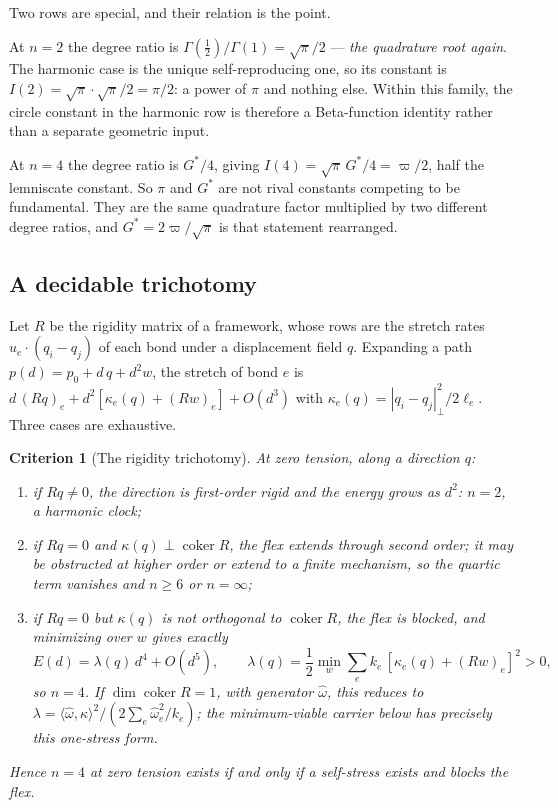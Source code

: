 \documentclass[11pt,a4paper]{article}
\newcommand{\Gstar}{{G^{*}}}
\theoremstyle{definition}
\theoremstyle{plain}
\newtheorem{criterion}{Criterion}
\theoremstyle{remark}
\begin{document}
Two rows are special, and their relation is the point.

At $n=2$ the degree ratio is $\Gamma(\tfrac12)/\Gamma(1) = \sqrt\pi/2$ ---
\emph{the quadrature root again}. The harmonic case is the unique
self-reproducing one, so its constant is $I(2) = \sqrt\pi\cdot\sqrt\pi/2 =
\pi/2$: a power of $\pi$ and nothing else. Within this family, the circle
constant in the harmonic row is therefore a Beta-function identity rather
than a separate geometric input.

At $n=4$ the degree ratio is $\Gstar/4$, giving $I(4) = \sqrt\pi\,\Gstar/4
= \varpi/2$, half the lemniscate constant. So $\pi$ and $\Gstar$ are not
rival constants competing to be fundamental. They are the same
quadrature factor multiplied by two different degree ratios, and
$\Gstar = 2\varpi/\sqrt\pi$ is that statement rearranged.

\subsection{A decidable trichotomy}

Let $R$ be the rigidity matrix of a framework, whose rows are the stretch
rates $\hat{u}_e\cdot(q_i-q_j)$ of each bond under a displacement field
$q$. Expanding a path $p(d) = p_0 + d\,q + d^2 w$, the stretch of bond $e$
is $d\,(Rq)_e + d^2[\kappa_e(q) + (Rw)_e] + O(d^3)$ with
$\kappa_e(q) = |q_i-q_j|_\perp^2/2\ell_e$. Three cases are exhaustive.

\begin{criterion}[The rigidity trichotomy]
\label{crit:trichotomy}
At zero tension, along a direction $q$:
\begin{enumerate}\itemsep2pt
\item if $Rq \neq 0$, the direction is first-order rigid and the energy
      grows as $d^2$: $n=2$, a harmonic clock;
\item if $Rq = 0$ and $\kappa(q) \perp \operatorname{coker} R$, the flex
      extends through second order; it may be obstructed at higher order
      or extend to a finite mechanism, so the quartic term vanishes and
      $n \ge 6$ or $n = \infty$;
\item if $Rq = 0$ but $\kappa(q)$ is not orthogonal to
      $\operatorname{coker} R$, the flex is \emph{blocked}, and minimizing
      over $w$ gives exactly
      \begin{equation}
      E(d) = \lambda(q)\,d^4 + O(d^5), \qquad
      \lambda(q) =
      \frac12\min_w\sum_e k_e\,[\kappa_e(q)+(Rw)_e]^2 >0 ,
      \label{eq:quartic}
      \end{equation}
      so $n=4$. If $\dim\operatorname{coker}R=1$, with generator
      $\hat\omega$, this reduces to
      $\lambda=\langle\hat\omega,\kappa\rangle^2/
      (2\sum_e\hat\omega_e^2/k_e)$; the minimum-viable carrier below has
      precisely this one-stress form.
\end{enumerate}
Hence $n=4$ at zero tension exists \emph{if and only if} a self-stress
exists and blocks the flex.
\end{criterion}
\end{document}
